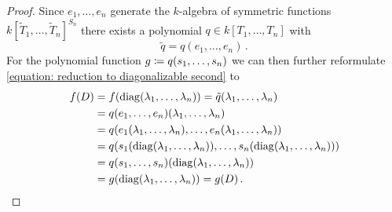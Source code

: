 \begin{proof}
  
  Since $e_1, \dotsc, e_n$ generate the $k$-algebra of symmetric functions $k[\tilde{T}_1, \dotsc, \tilde{T}_n]^{S_n}$ there exists a polynomial $q \in k[T_1, \dotsc, T_n]$ with
  \[
      \tilde{q}
    = q(e_1, \dotsc, e_n) \,.
  \]
  For the polynomial function $g \coloneqq q(s_1, \dotsc, s_n)$ we can then further reformulate \eqref{equation: reduction to diagonalizable second} to
  \begin{align*}
        f(D)
    &=  f(\operatorname{diag}(\lambda_1, \dotsc, \lambda_n))
     =  \tilde{q}(\lambda_1, \dotsc, \lambda_n) \\
    &=  q(e_1, \dotsc, e_n)(\lambda_1, \dotsc, \lambda_n) \\
    &=  q( e_1(\lambda_1, \dotsc, \lambda_n), \dotsc, e_n(\lambda_1, \dotsc, \lambda_n)  )  \\
    &=  q( s_1( \operatorname{diag}(\lambda_1, \dotsc, \lambda_n) ), \dotsc, s_n( \operatorname{diag}(\lambda_1, \dotsc, \lambda_n) )  )  \\
    &=  q(s_1, \dotsc, s_n)( \operatorname{diag}(\lambda_1, \dotsc, \lambda_n) )  \\
    &=  g( \operatorname{diag}(\lambda_1, \dotsc, \lambda_n) )
     =  g(D) \,.
  \end{align*}
  

\end{proof}
